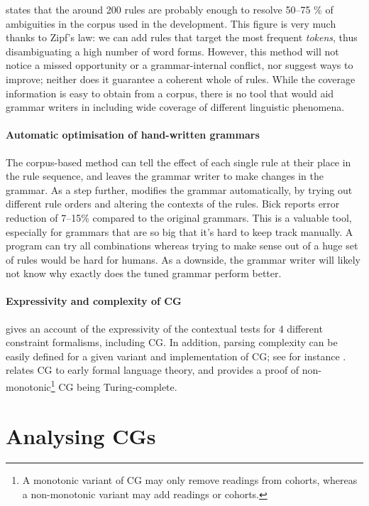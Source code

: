 \citet{voutilainen2004} states that the around 200 rules are probably enough to resolve 50--75 \% of ambiguities in the corpus used in the development.
This figure is very much thanks to Zipf's law: we can add rules that target the most frequent \emph{tokens}, thus disambiguating a high number of word forms.
However, this method will not notice a missed opportunity or a grammar-internal conflict, nor suggest ways to improve; neither does it guarantee a coherent whole of rules.
While the coverage information is easy to obtain from a corpus, there is no tool that would aid grammar writers in including wide coverage of different linguistic phenomena.


\paragraph{Automatic optimisation of hand-written grammars }

The corpus-based method can tell the effect of each single rule at their place in the rule sequence, and leaves the grammar writer to make changes in the grammar.
As a step further, \citet{bick2013tuning} modifies the grammar automatically, by trying
out different rule orders and altering the contexts of the rules.
Bick reports error reduction of 7--15\% compared to the original grammars.
This is a valuable tool, especially for grammars that are so big that it's hard to keep track manually. A program can try all combinations whereas trying to make sense out of a huge set of rules would be hard for humans.
As a downside, the grammar writer will likely not know why exactly does the tuned grammar perform better.


\paragraph{Expressivity and complexity of CG}
\citet{tapanainen1999phd} gives an account of the expressivity of
the contextual tests for 4 different constraint formalisms, including CG.
In addition, parsing complexity can be easily defined for a given variant and
implementation of CG; see for instance \citet{nemeskey14}.
\citet{ylijyra2017} relates CG to early formal language theory, and
provides a proof of non-monotonic\footnote{A monotonic
  variant of CG may only remove readings from cohorts, whereas a non-monotonic
  variant may add readings or cohorts.} CG being Turing-complete.

\section{Analysing CGs}
\label{sec:sectionCGana}

